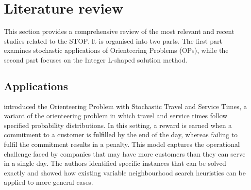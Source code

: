 \documentclass[11pt]{article}
\theoremstyle{definition}
\begin{document}
\section{Literature review}
\label{sec:literature}

This section provides a comprehensive review of the most relevant and recent studies related to the STOP. It is organised into two parts. The first part examines stochastic applications of Orienteering Problems (OPs), while the second part focuses on the Integer L-shaped solution method.



\subsection{Applications}

\citet{Campbell2011} introduced the Orienteering Problem with Stochastic Travel and Service Times, a variant of the orienteering problem in which travel and service times follow specified probability distributions. In this setting, a reward is earned when a commitment to a customer is fulfilled by the end of the day, whereas failing to fulfil the commitment results in a penalty. This model captures the operational challenge faced by companies that may have more customers than they can serve in a single day. The authors identified specific instances that can be solved exactly and showed how existing variable neighbourhood search heuristics can be applied to more general cases.
\end{document}
